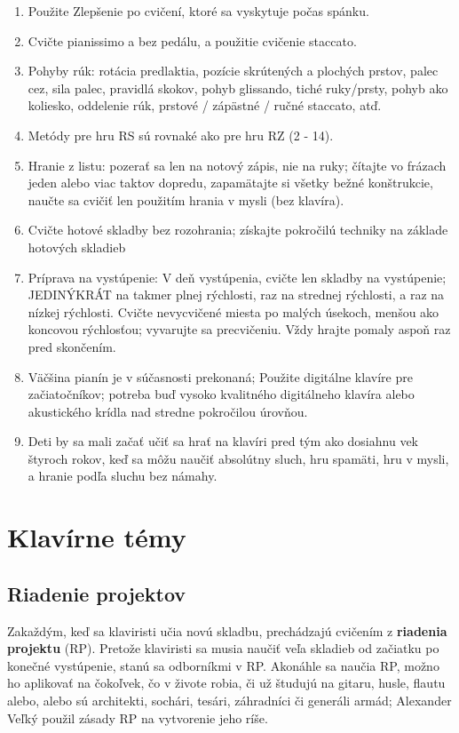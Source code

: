 \documentclass[11pt,a4paper]{book}
\begin{document}
\begin{enumerate}
\item Použite Zlepšenie po cvičení, ktoré sa vyskytuje počas spánku. 

\item Cvičte pianissimo a bez pedálu, a použitie cvičenie staccato.

\item Pohyby rúk: rotácia predlaktia, pozície skrútených a plochých prstov, palec cez, sila palec, 
pravidlá skokov, pohyb glissando, tiché ruky/prsty, pohyb ako koliesko, oddelenie rúk, prstové / zápästné / ručné staccato, atď.

\item Metódy pre hru RS sú rovnaké ako pre hru RZ (2 - 14).

\item Hranie z listu: pozerať sa len na notový zápis, nie na ruky; čítajte vo frázach jeden alebo viac taktov dopredu, zapamätajte si všetky bežné konštrukcie, naučte sa cvičiť len použitím hrania v mysli (bez klavíra).

\item Cvičte hotové skladby bez rozohrania; získajte pokročilú techniky na základe hotových skladieb

\item Príprava na vystúpenie: V deň vystúpenia, cvičte len skladby na vystúpenie; JEDINÝKRÁT na takmer plnej rýchlosti, raz na strednej rýchlosti, a raz na nízkej rýchlosti. Cvičte nevycvičené miesta po malých úsekoch, menšou ako koncovou rýchlosťou; vyvarujte sa precvičeniu. Vždy hrajte pomaly aspoň raz pred skončením.

\item Väčšina pianín je v súčasnosti prekonaná; Použite digitálne klavíre pre začiatočníkov; potreba buď vysoko kvalitného digitálneho klavíra alebo akustického krídla nad stredne pokročilou úrovňou.

\item Deti by sa mali začať učiť sa hrať na klavíri pred tým ako dosiahnu vek štyroch rokov, keď sa môžu naučiť absolútny sluch, hru spamäti, hru v mysli, a hranie podľa sluchu bez námahy.
\end{enumerate}

\chapter{Klavírne témy}\label{s:piano-topics}

\section{Riadenie projektov}\label{s:project-management}
Zakaždým, keď sa klaviristi učia novú skladbu, prechádzajú cvičením z \textbf{riadenia projektu} (RP). Pretože klaviristi sa musia naučiť veľa skladieb od začiatku po konečné vystúpenie, stanú sa odborníkmi v RP. Akonáhle sa naučia RP, možno ho aplikovať na čokoľvek, čo v živote robia, či už študujú na gitaru, husle, flautu alebo, alebo sú architekti, sochári, tesári, záhradníci či generáli armád; Alexander Veľký použil zásady RP na vytvorenie jeho ríše.
\end{document}

